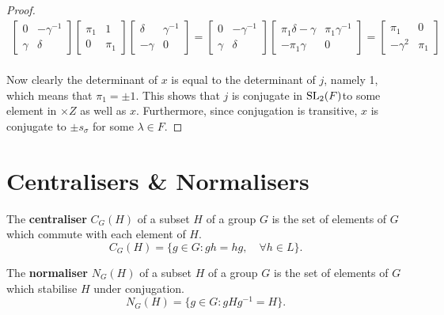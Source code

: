 \begin{proof}
\begin{align*}
    \begin{bmatrix} 0 & -\gamma^{-1} \\ \gamma & \delta \end{bmatrix} \begin{bmatrix} \pi_1 & 1 \\ 0 & \pi_1 \end{bmatrix} \begin{bmatrix} \delta & \gamma^{-1} \\ -\gamma & 0 \end{bmatrix} = \begin{bmatrix} 0 & -\gamma^{-1} \\ \gamma & \delta \end{bmatrix} \begin{bmatrix} \pi_1 \delta - \gamma & \pi_1 \gamma^{-1} \\ -\pi_1 \gamma & 0 \end{bmatrix} = \begin{bmatrix} \pi_1 & 0 \\ -\gamma^{2} & \pi_1 \end{bmatrix}
\end{align*}
\\
Now clearly the determinant of $x$ is equal to the determinant of $j$, namely 1, which means that $\pi_1 = \pm 1$. This shows that $j$ is conjugate in $\operatorname{SL}_2(F)$to some element in $\times Z$ as well as $x$. Furthermore, since conjugation is transitive, $x$ is conjugate to $\pm s_\sigma$ for some $\lambda \in F$.

\end{proof}

\section{Centralisers \& Normalisers}

\begin{definition}
\leanok
The \textbf{centraliser} $C_G(H)$ of a subset $H$ of a group $G$ is the set of elements of $G$ which commute with each element of $H$.
\begin{equation*} C_G(H) = \{ g \in G  : gh=hg, \quad \forall h\in L \}. \end{equation*} 
\end{definition}

\begin{definition}
\leanok
The \textbf{normaliser} $N_G(H)$ of a subset $H$ of a group $G$ is the set of elements of $G$ which stabilise $H$ under conjugation.
\begin{equation*} N_G(H) = \{ g \in G : gHg^{-1}=H\}. \end{equation*}
\end{definition}


